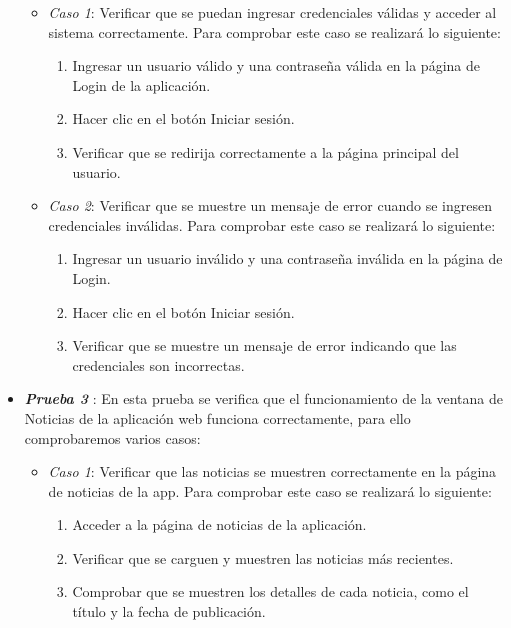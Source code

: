 \begin{itemize}
    \begin{itemize}
        \item \textit{Caso 1}:
    Verificar que se puedan ingresar credenciales válidas y acceder al sistema correctamente. Para comprobar este caso se realizará lo siguiente:
   \begin{enumerate}
       \item Ingresar un usuario válido y una contraseña válida en la página de Login de la aplicación.
       \item Hacer clic en el botón Iniciar sesión.
       \item Verificar que se redirija correctamente a la página principal del usuario.
   \end{enumerate}
    \end{itemize}

    \begin{itemize}
        \item \textit{Caso 2}:
    Verificar que se muestre un mensaje de error cuando se ingresen credenciales inválidas. Para comprobar este caso se realizará lo siguiente:
   \begin{enumerate}
       \item Ingresar un usuario inválido y una contraseña inválida en la página de Login.
       \item Hacer clic en el botón Iniciar sesión.
       \item Verificar que se muestre un mensaje de error indicando que las credenciales son incorrectas.
   \end{enumerate}
    \end{itemize}


     \item \textbf{\textit{Prueba 3}} \label{Prueba3}: En esta prueba se verifica que el funcionamiento de la ventana de Noticias de la aplicación web funciona correctamente, para ello comprobaremos varios casos:

      \begin{itemize}
        \item \textit{Caso 1}:
    Verificar que las noticias se muestren correctamente en la página de noticias de la app. Para comprobar este caso se realizará lo siguiente:
   \begin{enumerate}
       \item Acceder a la página de noticias de la aplicación.
       \item Verificar que se carguen y muestren las noticias más recientes.
       \item Comprobar que se muestren los detalles de cada noticia, como el título y la fecha de publicación.
   \end{enumerate}
    \end{itemize}


\end{itemize}
